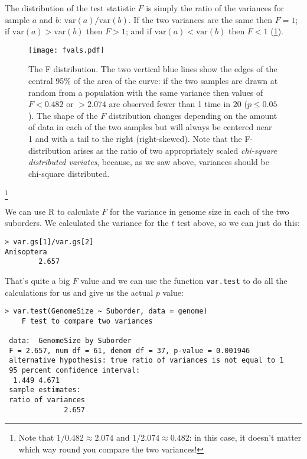 The distribution of the test statistic $F$ is simply the ratio of the 
variances for sample $a$ and $b$: $\textrm{var}(a)/\textrm{var}(b)$. If 
the two variances are the same then $F=1$; if $\textrm{var}(a) > 
\textrm{var}(b)$ then $F > 1$; and if $\textrm{var}(a) < 
\textrm{var}(b)$ then $F < 1$ (\ref{fig:fdist}).

\begin{figure}
	\centering
	\texttt{[image: fvals.pdf]} 
	\caption[Caption for LOF]{The F distribution. The two vertical blue 
	lines show the edges of the central 95\% of the area of the curve: if 
	the two samples are drawn at random from a population with the same 
	variance then values of $F < 0.482$ or $> 2.074$ are observed fewer 
	than 1 time in 20 ($p\le0.05$ )\protect\footnotemark . The shape of 
	the $F$ distribution changes depending on the amount of data in each 
	of the two samples but will always be centered 
	near 1 and with a tail to the right (right-skewed). Note that the 
	F-distribution arises as the ratio of two appropriately scaled {\it 
	chi-square distributed variates}, because, as we saw above, variances 
	should be chi-square distributed.}
\label{fig:fdist} 
\end{figure}
\footnote{Note that $1/0.482 \approx 2.074$ 
	and $1/2.074 \approx 0.482$: in this case, it doesn't matter which 
	way round you compare the two variances!}

We can use R to calculate $F$ for the variance in genome size in each 
of the two suborders. We calculated the variance for the $t$ test 
above, so we can just do this:

\begin{lstlisting}
> var.gs[1]/var.gs[2]
Anisoptera
		2.657
\end{lstlisting}

That's quite a big $F$ value and we can use the function {\tt var.test} 
to do all the calculations for us and give us the actual $p$ value:

\begin{lstlisting}
> var.test(GenomeSize ~ Suborder, data = genome) 
 	F test to compare two variances
 
 data:  GenomeSize by Suborder 
 F = 2.657, num df = 61, denom df = 37, p-value = 0.001946
 alternative hypothesis: true ratio of variances is not equal to 1 
 95 percent confidence interval:
  1.449 4.671 
 sample estimates:
 ratio of variances 
              2.657 
\end{lstlisting}

